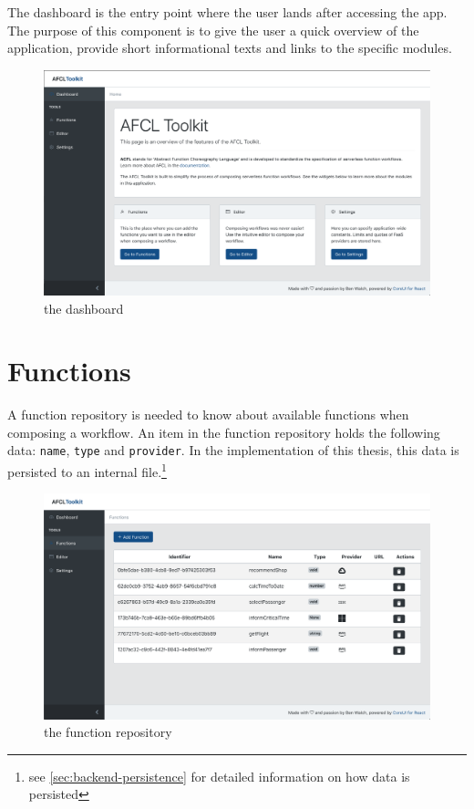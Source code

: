 \documentclass[a4paper,12pt,pdftex,halfparskip,cleardoubleempty,bibtotoc,liststotoc]{scrbook}
\begin{document}
The dashboard is the entry point where the user lands after accessing the app. The purpose of this component is to give the user a quick overview of the application, provide short informational texts and links to the specific modules. 

\begin{figure}[H]
  \centering
  \includegraphics[width=\textwidth]{dashboard}
  \caption{the dashboard}
\end{figure}

\section{Functions}

A function repository is needed to know about available functions when composing a workflow. An item in the function repository holds the following data: \texttt{name}, \texttt{type} and \texttt{provider}. In the implementation of this thesis, this data is persisted to an internal file.\footnote{see \ref{sec:backend-persistence} for detailed information on how data is persisted}

\begin{figure}[H]
  \centering
  \includegraphics[width=\textwidth]{functions}
  \caption{the function repository}
\end{figure}
\end{document}

